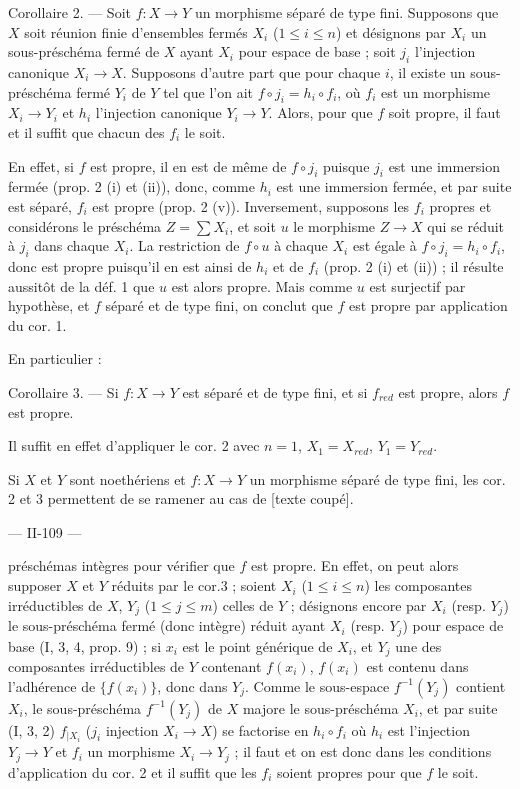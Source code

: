 Corollaire 2. — Soit $f: X \to Y$ un morphisme séparé de type fini. Supposons que $X$ soit réunion finie d'ensembles fermés $X_i$ ($1 \le i \le n$) et désignons par $X_i$ un sous-préschéma fermé de $X$ ayant $X_i$ pour espace de base ; soit $j_i$ l'injection canonique $X_i \to X$. Supposons d'autre part que pour chaque $i$, il existe un sous-préschéma fermé $Y_i$ de $Y$ tel que l'on ait $f \circ j_i = h_i \circ f_i$, où $f_i$ est un morphisme $X_i \to Y_i$ et $h_i$ l'injection canonique $Y_i \to Y$. Alors, pour que $f$ soit propre, il faut et il suffit que chacun des $f_i$ le soit.

En effet, si $f$ est propre, il en est de même de $f \circ j_i$ puisque $j_i$ est une immersion fermée (prop. 2 (i) et (ii)), donc, comme $h_i$ est une immersion fermée, et par suite est séparé, $f_i$ est propre (prop. 2 (v)). Inversement, supposons les $f_i$ propres et considérons le préschéma $Z = \sum X_i$, et soit $u$ le morphisme $Z \to X$ qui se réduit à $j_i$ dans chaque $X_i$. La restriction de $f \circ u$ à chaque $X_i$ est égale à $f \circ j_i = h_i \circ f_i$, donc est propre puisqu'il en est ainsi de $h_i$ et de $f_i$ (prop. 2 (i) et (ii)) ; il résulte aussitôt de la déf. 1 que $u$ est alors propre. Mais comme $u$ est surjectif par hypothèse, et $f$ séparé et de type fini, on conclut que $f$ est propre par application du cor. 1.

En particulier :

Corollaire 3. — Si $f: X \to Y$ est séparé et de type fini, et si $f_{red}$ est propre, alors $f$ est propre.

Il suffit en effet d'appliquer le cor. 2 avec $n=1$, $X_1 = X_{red}$, $Y_1 = Y_{red}$.

Si $X$ et $Y$ sont noethériens et $f: X \to Y$ un morphisme séparé de type fini, les cor. 2 et 3 permettent de se ramener au cas de [texte coupé].

\newpage


— II-109 —

préschémas intègres pour vérifier que $f$ est propre. En effet, on peut alors supposer $X$ et $Y$ réduits par le cor.3 ; soient $X_i$ ($1 \le i \le n$) les composantes irréductibles de $X$, $Y_j$ ($1 \le j \le m$) celles de $Y$ ; désignons encore par $X_i$ (resp. $Y_j$) le sous-préschéma fermé (donc intègre) réduit ayant $X_i$ (resp. $Y_j$) pour espace de base (I, 3, 4, prop. 9) ; si $x_i$ est le point générique de $X_i$, et $Y_j$ une des composantes irréductibles de $Y$ contenant $f(x_i)$, $f(x_i)$ est contenu dans l'adhérence de $\{f(x_i)\}$, donc dans $Y_j$. Comme le sous-espace $f^{-1}(Y_j)$ contient $X_i$, le sous-préschéma $f^{-1}(Y_j)$ de $X$ majore le sous-préschéma $X_i$, et par suite (I, 3, 2) $f_{|X_i}$ ($j_i$ injection $X_i \to X$) se factorise en $h_i \circ f_i$ où $h_i$ est l'injection $Y_j \to Y$ et $f_i$ un morphisme $X_i \to Y_j$ ; il faut et on est donc dans les conditions d'application du cor. 2 et il suffit que les $f_i$ soient propres pour que $f$ le soit.

